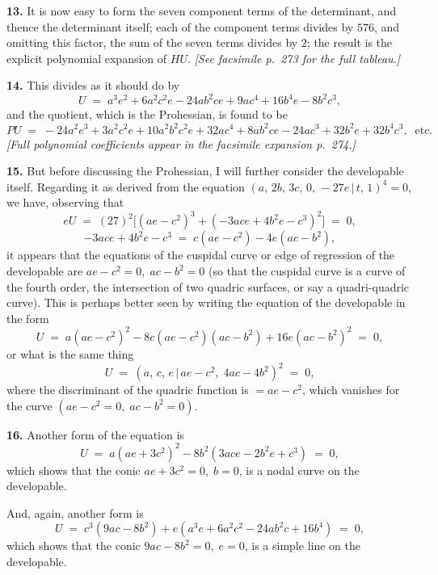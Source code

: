 \documentclass[11pt,a4paper]{article}
\providecommand{\mid}{\,|\,}
\begin{document}
\medskip

\textbf{13.} It is now easy to form the seven component terms of the determinant, and thence the determinant itself; each of the component terms divides by $576$, and omitting this factor, the sum of the seven terms divides by $2$; the result is the explicit polynomial expansion of $HU$. \textit{[See facsimile p.~273 for the full tableau.]}

\medskip

\textbf{14.} This divides as it should do by
\[
U \;=\; a^3 e^2 + 6a^2 c^2 e - 24 ab^2 ce + 9 ac^4 + 16 b^4 e - 8 b^2 c^3,
\]
and the quotient, which is the Prohessian, is found to be
\[
PU \;=\; -24 a^2 e^3 + 3 a^2 c^2 e + 10 a^2 b^2 c^2 e + 32 a c^4 + 8 a b^2 c e - 24 a c^3 + 32 b^2 e + 32 b^4 c^3, \;\;\text{etc.}
\]
\textit{[Full polynomial coefficients appear in the facsimile expansion p.~274.]}

\medskip

\textbf{15.} But before discussing the Prohessian, I will further consider the developable itself. Regarding it as derived from the equation $(a,\,2b,\,3c,\,0,\,-27e\mid t,\,1)^4 = 0$, we have, observing that
\[
eU \;=\; (27)^2\bigl[(ae - c^2)^3 + (-3ace + 4b^2 e - c^3)^2\bigr] \;=\; 0,
\]
\[
-3ace + 4b^2 e - c^3 \;=\; c(ae - c^2) - 4e(ac - b^2),
\]
it appears that the equations of the cuspidal curve or edge of regression of the developable are $ae - c^2 = 0,\;ac - b^2 = 0$ (so that the cuspidal curve is a curve of the fourth order, the intersection of two quadric surfaces, or say a quadri-quadric curve). This is perhaps better seen by writing the equation of the developable in the form
\[
U \;=\; a(ae - c^2)^2 - 8c(ae - c^2)(ac - b^2) + 16 e(ac - b^2)^2 \;=\; 0,
\]
or what is the same thing
\[
U \;=\; (a,\,c,\,e\mid ae - c^2,\;4ac - 4b^2)^2 \;=\; 0,
\]
where the discriminant of the quadric function is $= ae - c^2$, which vanishes for the curve $(ae - c^2 = 0,\;ac - b^2 = 0)$.

\medskip

\textbf{16.} Another form of the equation is
\[
U \;=\; a(ae + 3c^2)^2 - 8b^2(3ace - 2b^2 e + c^3) \;=\; 0,
\]
which shows that the conic $ae + 3c^2 = 0,\;b = 0$, is a nodal curve on the developable.

And, again, another form is
\[
U \;=\; c^3(9ac - 8b^2) + e(a^3 e + 6a^2 c^2 - 24 ab^2 c + 16 b^4) \;=\; 0,
\]
which shows that the conic $9ac - 8b^2 = 0,\;e = 0$, is a simple line on the developable.

\medskip
\end{document}
